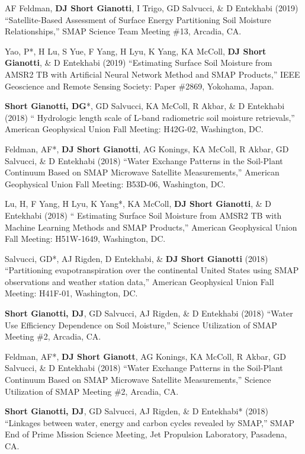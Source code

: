 \documentclass[10pt, a4paper]{article}
\newcommand{\lbr}{\vspace*{12pt}}
\newcommand{\years}[1]{\mbox{}\marginnote{\scriptsize #1}} %
\begin{document}
\years{2019}AF Feldman, \textbf{DJ Short Gianotti}, I Trigo, GD Salvucci, \& D Entekhabi (2019) ``Satellite-Based Assessment of Surface Energy Partitioning Soil Moisture Relationships,'' SMAP Science Team Meeting \#13, Arcadia, CA.\lbr %
 
\years{2019} Yao, P*, H Lu, S Yue, F Yang, H Lyu, K Yang, KA McColl, \textbf{DJ Short Gianotti}, \& D Entekhabi (2019) ``Estimating Surface Soil Moisture from AMSR2 TB with Artificial Neural Network Method and SMAP Products,'' IEEE Geoscience and Remote Sensing Society: Paper \#2869, Yokohama, Japan.\lbr 
 
\years{2018}\textbf{Short Gianotti, DG}*, GD Salvucci, KA McColl, R Akbar, \& D Entekhabi (2018) `` Hydrologic length scale of L-band radiometric soil moisture retrievals,'' American Geophysical Union Fall Meeting: H42G-02, Washington, DC.\lbr

\years{2018}Feldman, AF*, \textbf{DJ Short Gianotti}, AG Konings, KA McColl, R Akbar, GD Salvucci, \& D Entekhabi (2018) ``Water Exchange Patterns in the Soil-Plant Continuum Based on SMAP Microwave Satellite Measurements,'' American Geophysical Union Fall Meeting: B53D-06, Washington, DC.\lbr

\years{2018}Lu, H, F Yang, H Lyu, K Yang*, KA McColl, \textbf{DJ Short Gianotti}, \& D Entekhabi (2018) `` Estimating Surface Soil Moisture from AMSR2 TB with Machine Learning Methods and SMAP Products,'' American Geophysical Union Fall Meeting: H51W-1649, Washington, DC.\lbr

\years{2018}Salvucci, GD*, AJ Rigden, D Entekhabi, \& \textbf{DJ Short Gianotti} (2018) ``Partitioning evapotranspiration over the continental United States using SMAP observations and weather station data,'' American Geophysical Union Fall Meeting: H41F-01, Washington, DC.\lbr

\years{2018}\textbf{Short Gianotti, DJ}, GD Salvucci, AJ Rigden, \& D Entekhabi (2018) ``Water Use Efficiency Dependence on Soil Moisture,'' Science Utilization of SMAP Meeting \#2, Arcadia, CA.\lbr %

\years{2018}Feldman, AF*, \textbf{DJ Short Gianott}, AG Konings, KA McColl, R Akbar, GD Salvucci, \& D Entekhabi (2018) ``Water Exchange Patterns in the Soil-Plant Continuum Based on SMAP Microwave Satellite Measurements,'' Science Utilization of SMAP Meeting \#2, Arcadia, CA.\lbr %

\years{2018}\textbf{Short Gianotti, DJ}, GD Salvucci, AJ Rigden, \& D Entekhabi* (2018) ``Linkages between water, energy and carbon cycles revealed by SMAP,'' SMAP End of Prime Mission Science Meeting, Jet Propulsion Laboratory, Pasadena, CA. \lbr %
\end{document}
